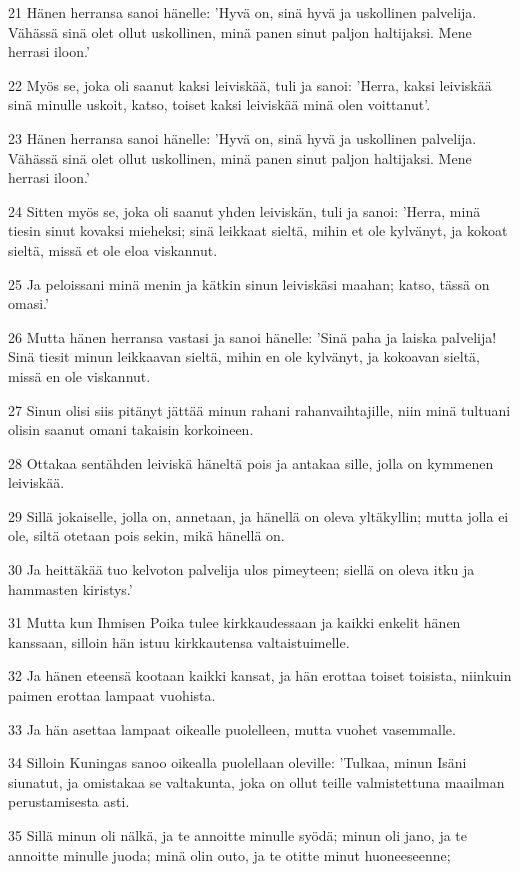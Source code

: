 \par 21 Hänen herransa sanoi hänelle: 'Hyvä on, sinä hyvä ja uskollinen palvelija. Vähässä sinä olet ollut uskollinen, minä panen sinut paljon haltijaksi. Mene herrasi iloon.'
\par 22 Myös se, joka oli saanut kaksi leiviskää, tuli ja sanoi: 'Herra, kaksi leiviskää sinä minulle uskoit, katso, toiset kaksi leiviskää minä olen voittanut'.
\par 23 Hänen herransa sanoi hänelle: 'Hyvä on, sinä hyvä ja uskollinen palvelija. Vähässä sinä olet ollut uskollinen, minä panen sinut paljon haltijaksi. Mene herrasi iloon.'
\par 24 Sitten myös se, joka oli saanut yhden leiviskän, tuli ja sanoi: 'Herra, minä tiesin sinut kovaksi mieheksi; sinä leikkaat sieltä, mihin et ole kylvänyt, ja kokoat sieltä, missä et ole eloa viskannut.
\par 25 Ja peloissani minä menin ja kätkin sinun leiviskäsi maahan; katso, tässä on omasi.'
\par 26 Mutta hänen herransa vastasi ja sanoi hänelle: 'Sinä paha ja laiska palvelija! Sinä tiesit minun leikkaavan sieltä, mihin en ole kylvänyt, ja kokoavan sieltä, missä en ole viskannut.
\par 27 Sinun olisi siis pitänyt jättää minun rahani rahanvaihtajille, niin minä tultuani olisin saanut omani takaisin korkoineen.
\par 28 Ottakaa sentähden leiviskä häneltä pois ja antakaa sille, jolla on kymmenen leiviskää.
\par 29 Sillä jokaiselle, jolla on, annetaan, ja hänellä on oleva yltäkyllin; mutta jolla ei ole, siltä otetaan pois sekin, mikä hänellä on.
\par 30 Ja heittäkää tuo kelvoton palvelija ulos pimeyteen; siellä on oleva itku ja hammasten kiristys.'
\par 31 Mutta kun Ihmisen Poika tulee kirkkaudessaan ja kaikki enkelit hänen kanssaan, silloin hän istuu kirkkautensa valtaistuimelle.
\par 32 Ja hänen eteensä kootaan kaikki kansat, ja hän erottaa toiset toisista, niinkuin paimen erottaa lampaat vuohista.
\par 33 Ja hän asettaa lampaat oikealle puolelleen, mutta vuohet vasemmalle.
\par 34 Silloin Kuningas sanoo oikealla puolellaan oleville: 'Tulkaa, minun Isäni siunatut, ja omistakaa se valtakunta, joka on ollut teille valmistettuna maailman perustamisesta asti.
\par 35 Sillä minun oli nälkä, ja te annoitte minulle syödä; minun oli jano, ja te annoitte minulle juoda; minä olin outo, ja te otitte minut huoneeseenne;
